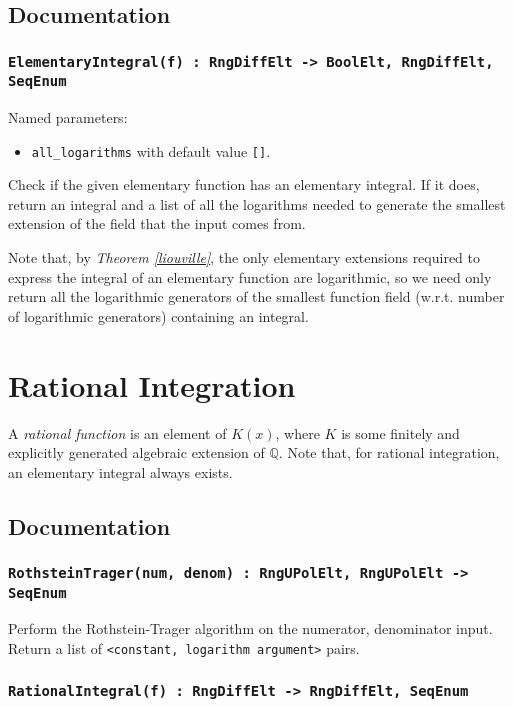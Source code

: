 \documentclass{article}
\theoremstyle{plain}
\theoremstyle{definition}
\newcommand{\Q}{\mathbb{Q}}
\newcommand{\thmref}[1]{\emph{Theorem \ref{#1}}}
\begin{document}
\subsection{Documentation}

\subsubsection*{\lstinline{ElementaryIntegral(f) : RngDiffElt -> BoolElt, RngDiffElt, SeqEnum}}

Named parameters:
\begin{itemize}
    \item[] \lstinline{all_logarithms} with default value \lstinline{[]}.
\end{itemize}

\noindent Check if the given elementary function has an elementary integral. If
it does, return an integral and a list of all the logarithms needed to generate
the smallest extension of the field that the input comes from. \medbreak

Note that, by \thmref{liouville}, the only elementary extensions required to
express the integral of an  elementary function are logarithmic, so we need only
return all the logarithmic generators of the smallest function field (w.r.t. number of logarithmic generators) containing an integral.

\section{Rational Integration} \label{sec:rat_int}
A \emph{rational function} is an element of $K(x)$, where $K$ is some finitely
and explicitly generated algebraic extension of $\Q$. Note that, for rational
integration, an elementary integral always exists.

\subsection{Documentation}

\subsubsection*{\lstinline{RothsteinTrager(num, denom) : RngUPolElt, RngUPolElt -> SeqEnum}}
Perform the Rothstein-Trager algorithm on the numerator, denominator input.
Return a list of \lstinline{<constant, logarithm argument>} pairs.

\subsubsection*{\lstinline{RationalIntegral(f) : RngDiffElt -> RngDiffElt, SeqEnum}}
\end{document}
